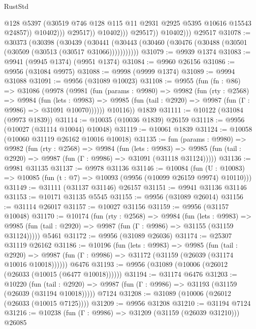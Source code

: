 \begin{lexlean}{RustStd}
\begin{coremodule}
                                @128
                                @5397
                                (@30519 @746 @128 @115 @11 @2931 @2925 @5395 @10616 @15543 @24857))
                              @10402)))
                        @29517))
                    @10402)))
              @29517))
          @10402)))
    @29517
@31078 := @30373
    (@30398
      (@30439
        (@30441 (@30443 (@30460 (@30476 (@30488 (@30501 (@30509 (@30513 (@30517 @31066)))))))))))
@31079 := @9939 @1374
@31083 := @9941 (@9945 @1374) (@9951 @1374)
@31084 := @9960 @26156
@31086 := @9956 (@31084 @9975)
@31088 := @9998 (@9999 @1374)
@31089 := @9994 @31088
@31091 := @9956 (@31089 @10023)
@31108 := @9955
    (fun (fn : @86) =>
    @31086
      (@9978
        (@9981
          (fun (params : @9980) =>
          @9982
            (fun (rty : @2568) =>
            @9984
              (fun (lets : @9983) =>
              @9985 (fun (tail : @2920) => @9987 (fun (Γ : @9986) => @31091 @10070))))))
        @10116))
    @1839
@31111 := @10122 (@31084 (@9973 @1839))
@31114 := @10035 (@10036 @1839) @26159
@31118 := @9956 (@10027 (@31114 @10044) @10048)
@31119 := @10061 @1839
@31124 := @10058 (@10060 @31119 @26162 @10016 @10018)
@31135 := fun (params : @9980) =>
  @9982
    (fun (rty : @2568) =>
    @9984
      (fun (lets : @9983) =>
      @9985 (fun (tail : @2920) => @9987 (fun (Γ : @9986) => @31091 (@31118 @31124)))))
@31136 := @9981 @31135
@31137 := @9978 @31136
@31146 := @10084
    (fun (U : @10083) => @10085 (fun (t : @7) => @10093 (@9956 (@10099 @26159 @9974) @10110)))
@31149 := @31111 (@31137 @31146) @26157
@31151 := @9941 @31136 @31146
@31153 := @10171 @31135 @5545
@31155 := @9956 (@31089 @26014)
@31156 := @31114 @26017
@31157 := @10027 @31156
@31159 := @9956 (@31157 @10048)
@31170 := @10174
    (fun (rty : @2568) =>
    @9984
      (fun (lets : @9983) =>
      @9985 (fun (tail : @2920) => @9987 (fun (Γ : @9986) => @31155 (@31159 @31124)))))
    @5461
@31172 := @9956 (@31089 @26036)
@31174 := @25307 @31119 @26162
@31186 := @10196
    (fun (lets : @9983) =>
    @9985
      (fun (tail : @2920) =>
      @9987 (fun (Γ : @9986) => @31172 (@31159 (@26039 (@31174 @10016 @10018))))))
    @6476
@31193 := @9956 (@31089 (@10006 (@26012 (@26033 (@10015 (@6477 @10018))))))
@31194 := @31174 @6476
@31203 := @10220
    (fun (tail : @2920) => @9987 (fun (Γ : @9986) => @31193 (@31159 (@26039 (@31194 @10018)))))
    @7124
@31208 := @31089 (@10006 (@26012 (@26033 (@10015 @7125))))
@31209 := @9956 @31208
@31210 := @31194 @7124
@31216 := @10238 (fun (Γ : @9986) => @31209 (@31159 (@26039 @31210))) @26085

\end{coremodule}
\end{lexlean}
